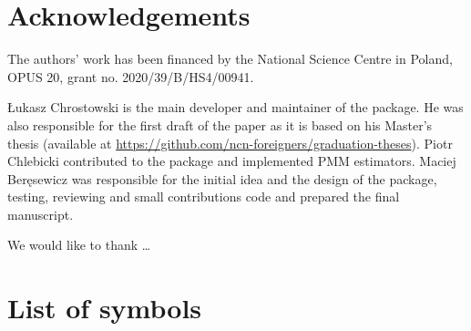 \documentclass[
]{jss}
\begin{document}
\section{Acknowledgements}\label{sec-acknowledgements}

The authors' work has been financed by the National Science Centre in
Poland, OPUS 20, grant no. 2020/39/B/HS4/00941.

Łukasz Chrostowski is the main developer and maintainer of the package.
He was also responsible for the first draft of the paper as it is based
on his Master's thesis (available at
\url{https://github.com/ncn-foreigners/graduation-theses}). Piotr
Chlebicki contributed to the package and implemented PMM estimators.
Maciej Beręsewicz was responsible for the initial idea and the design of
the package, testing, reviewing and small contributions code and
prepared the final manuscript.

We would like to thank \ldots{}

\clearpage

\appendix

\section{List of symbols}\label{list-of-symbols}
\end{document}
